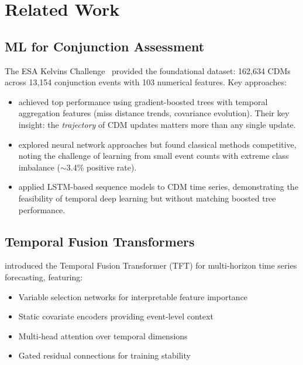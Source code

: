 \documentclass{article}
\begin{document}
\section{Related Work}
\label{sec:related}

\subsection{ML for Conjunction Assessment}
\label{sec:ml-ca}

The ESA Kelvins Challenge~\citep{uriot2021} provided the foundational dataset: 162,634 CDMs across 13,154 conjunction events with 103 numerical features. Key approaches:

\begin{itemize}
\item \textbf{\citet{stevenson2020}} achieved top performance using gradient-boosted trees with temporal aggregation features (miss distance trends, covariance evolution). Their key insight: the \emph{trajectory} of CDM updates matters more than any single update.
\item \textbf{\citet{siew2020}} explored neural network approaches but found classical methods competitive, noting the challenge of learning from small event counts with extreme class imbalance ($\sim$3.4\% positive rate).
\item \textbf{\citet{acciarini2021}} applied LSTM-based sequence models to CDM time series, demonstrating the feasibility of temporal deep learning but without matching boosted tree performance.
\end{itemize}

\subsection{Temporal Fusion Transformers}
\label{sec:tft}

\citet{lim2021} introduced the Temporal Fusion Transformer (TFT) for multi-horizon time series forecasting, featuring:
\begin{itemize}
\item Variable selection networks for interpretable feature importance
\item Static covariate encoders providing event-level context
\item Multi-head attention over temporal dimensions
\item Gated residual connections for training stability
\end{itemize}
\end{document}
